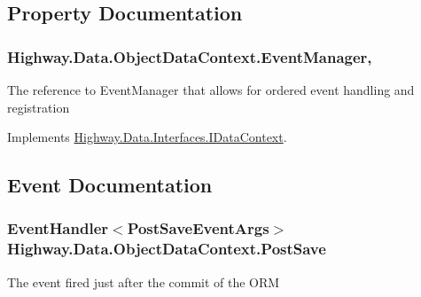 \subsection{Property Documentation}
\hypertarget{class_highway_1_1_data_1_1_object_data_context_a1be407a6d9a2d147511ca72d6a09ff49}{
\subsubsection[{Event\-Manager}]{ Highway.\-Data.\-Object\-Data\-Context.\-Event\-Manager\hspace{0.3cm}{\ttfamily [get]}, {\ttfamily [set]}}}\label{class_highway_1_1_data_1_1_object_data_context_a1be407a6d9a2d147511ca72d6a09ff49}


The reference to Event\-Manager that allows for ordered event handling and registration 



Implements \hyperlink{interface_highway_1_1_data_1_1_interfaces_1_1_i_data_context_a66d20c659a7c50d08705534ad750e1f8}{Highway.\-Data.\-Interfaces.\-I\-Data\-Context}.



\subsection{Event Documentation}
\hypertarget{class_highway_1_1_data_1_1_object_data_context_ab361ad5a8c621b099944e255b8593046}{
\subsubsection[{Post\-Save}]{\setlength{\rightskip}{0pt plus 5cm}Event\-Handler$<${\bf Post\-Save\-Event\-Args}$>$ Highway.\-Data.\-Object\-Data\-Context.\-Post\-Save}}\label{class_highway_1_1_data_1_1_object_data_context_ab361ad5a8c621b099944e255b8593046}


The event fired just after the commit of the O\-R\-M 



